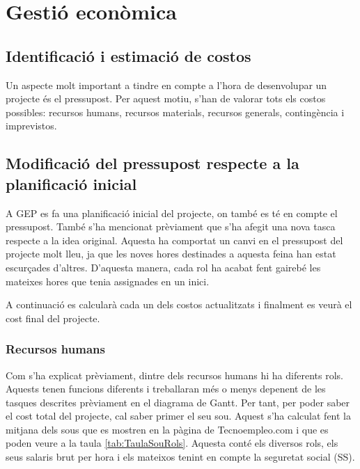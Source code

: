 \documentclass[a4paper]{article}
\begin{document}
\newpage
\section{Gestió econòmica}
\subsection{Identificació i estimació de costos}
Un aspecte molt important a tindre en compte a l'hora de desenvolupar un projecte és el pressupost. Per aquest motiu, s'han de valorar tots els costos possibles: recursos humans, recursos materials, recursos generals, contingència i imprevistos. 

\subsection{Modificació del pressupost respecte a la planificació inicial}
A GEP es fa una planificació inicial del projecte, on també es té en compte el pressupost. També s'ha mencionat prèviament que s'ha afegit una nova tasca respecte a la idea original. Aquesta ha comportat un canvi en el pressupost del projecte molt lleu, ja que les noves hores destinades a aquesta feina han estat escurçades d'altres. D'aquesta manera, cada rol ha acabat fent gairebé les mateixes hores que tenia assignades en un inici.

A continuació es calcularà cada un dels costos actualitzats i finalment es veurà el cost final del projecte.

\subsubsection{Recursos humans}
Com s'ha explicat prèviament, dintre dels recursos humans hi ha diferents rols. Aquests tenen funcions diferents i treballaran més o menys depenent de les tasques descrites prèviament en el diagrama de Gantt. Per tant, per poder saber el cost total del projecte, cal saber primer el seu sou. Aquest s'ha calculat fent la  mitjana dels sous que es mostren en la pàgina de Tecnoempleo.com \cite{tecnoEmpleo} i que es poden veure a la taula \ref{tab:TaulaSouRols}. Aquesta conté els diversos rols, els seus salaris brut per hora i els mateixos tenint en compte la seguretat social (SS). 
\end{document}
